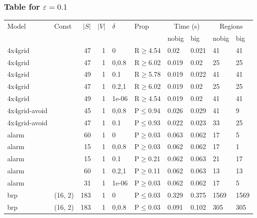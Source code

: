 \subsubsection{Table for \(\varepsilon=0.1\)}
\begin{longtable}{llrrllllll}

        \toprule
        Model & Const & $|S|$ & $|V|$ & $\delta$ & Prop & \multicolumn{2}{c}{Time (s)} & \multicolumn{2}{c}{Regions} \\
        \cmidrule(ll){7-8} \cmidrule(ll){9-10}
        & & & & & & nobig & big & nobig & big \\
        \midrule
        
 4x4grid       &          &     	47 & 1 & 0     & R$\geq$4.54  & 0.02   & 0.021   & 41      & 41   \\
 4x4grid       &          &     	47 & 1 & 0,0.8 & R$\geq$6.02  & 0.019  & 0.02    & 25      & 25   \\
 4x4grid       &          &     	49 & 1 & 0.1   & R$\geq$5.78  & 0.019  & 0.022   & 41      & 41   \\
 4x4grid       &          &     	47 & 1 & 0.2,1 & R$\geq$6.02  & 0.019  & 0.02    & 25      & 25   \\
 4x4grid       &          &     	49 & 1 & 1e-06 & R$\geq$4.54  & 0.019  & 0.02    & 41      & 41   \\
 4x4grid-avoid &          &     	45 & 1 & 0,0.8 & P$\leq$0.94  & 0.026  & 0.029   & 41      & 9    \\
 4x4grid-avoid &          &     	47 & 1 & 0.1   & P$\leq$0.93  & 0.022  & 0.023   & 33      & 25   \\
 alarm         &          &     	60 & 1 & 0     & P$\geq$0.03  & 0.063  & 0.062   & 17      & 5    \\
 alarm         &          &     	15 & 1 & 0,0.8 & P$\geq$0.03  & 0.062  & 0.062   & 17      & 1    \\
 alarm         &          &     	15 & 1 & 0.1   & P$\geq$0.21  & 0.062  & 0.063   & 21      & 17   \\
 alarm         &          &     	60 & 1 & 0.2,1 & P$\geq$0.11  & 0.062  & 0.063   & 13      & 13   \\
 alarm         &          &     	31 & 1 & 1e-06 & P$\geq$0.03  & 0.062  & 0.062   & 17      & 5    \\
 brp           & (16, 2)  &    	183 & 1 & 0     & P$\leq$0.03  & 0.329  & 0.375   & 1569    & 1569 \\
 brp           & (16, 2)  &    	183 & 1 & 0,0.8 & P$\leq$0.03  & 0.091  & 0.102   & 305     & 305  \\

\end{longtable}

